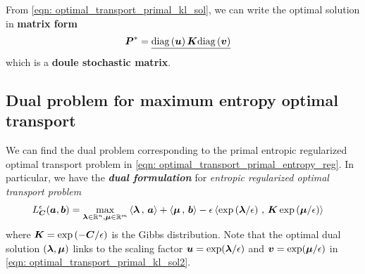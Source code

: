 \documentclass[11pt]{article}
\begin{document}
From \eqref{eqn: optimal_transport_primal_kl_sol}, we can write the optimal solution in \textbf{matrix form}
\begin{align}
\boldsymbol{P}^{*} &=\underline{\text{diag}\left(\boldsymbol{u}\right)\boldsymbol{K}\text{diag}\left(\boldsymbol{v}\right)}  \label{eqn: optimal_transport_primal_kl_sol2}
\end{align} which is a \textbf{doule stochastic matrix}.

\subsection{Dual problem for maximum entropy optimal transport}
We can find the dual problem corresponding to the primal entropic regularized optimal transport problem in \eqref{eqn: optimal_transport_primal_entropy_reg}. In particular, we have the \textbf{\emph{dual formulation}} for \emph{entropic regularized optimal transport problem}
\begin{align}
L_{\boldsymbol{C}}^{\epsilon}(\boldsymbol{a}, \boldsymbol{b}) = \max_{\boldsymbol{\lambda} \in {\mathbb R}^{n}, \boldsymbol{\mu} \in {\mathbb R}^{m}}& \left\langle \boldsymbol{\lambda}\,,\, \boldsymbol{a} \right\rangle + \left\langle \boldsymbol{\mu}\,,\, \boldsymbol{b} \right\rangle - \epsilon \left\langle \exp\left(\boldsymbol{\lambda}/\epsilon\right)\,,\, \boldsymbol{K}\exp\left(\boldsymbol{\mu}/\epsilon\right) \right\rangle \label{eqn: optimal_transport_dual_entropy_reg}
\end{align} where $\boldsymbol{K} = \exp\left(-\boldsymbol{C}/\epsilon\right)$ is the Gibbs distribution. Note that the optimal dual solution $(\boldsymbol{\lambda} , \boldsymbol{\mu})$ links to the scaling factor  $\boldsymbol{u} = \exp(\boldsymbol{\lambda}/\epsilon)$ and $\boldsymbol{v} =   \exp(\boldsymbol{\mu}/\epsilon)$ in \eqref{eqn: optimal_transport_primal_kl_sol2}.
\end{document}
